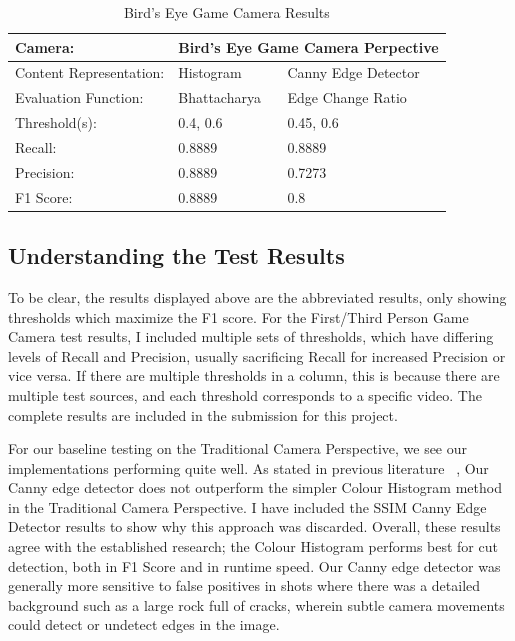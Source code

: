 \documentclass[12pt]{article}
\begin{document}
\begin{table}[h!]
    \begin{tabular}{|l|l|l|}
    \hline
    Camera:                 & \multicolumn{2}{l|}{Bird's Eye Game Camera Perpective} \\ \hline
    Content Representation: & Histogram            & Canny Edge Detector        \\ \hline
    Evaluation Function:    & Bhattacharya         & Edge Change Ratio          \\ \hline
    Threshold(s):           & 0.4, 0.6             & 0.45, 0.6                  \\ \hline
    Recall:                 & 0.8889               & 0.8889                     \\ \hline
    Precision:              & 0.8889               & 0.7273                     \\ \hline
    F1 Score:               & 0.8889               & 0.8                        \\ \hline
    \end{tabular}
    \caption{Bird's Eye Game Camera Results}
    \label{Bird's Eye Game Camera Results}
\end{table}
\subsection{Understanding the Test Results}
To be clear, the results displayed above are the abbreviated results, only showing thresholds which maximize the F1 score. For the First/Third Person Game Camera test results,
I included multiple sets of thresholds, which have differing levels of Recall and Precision, usually sacrificing Recall for increased Precision or vice versa. If there are 
multiple thresholds in a column, this is because there are multiple test sources, and each threshold corresponds to a specific video. The complete results are included in 
the submission for this project.

For our baseline testing on the Traditional Camera Perspective, we see our implementations performing quite well. As stated in previous literature ~\cite{lienhart1998comparison},
Our Canny edge detector does not outperform the simpler Colour Histogram method in the Traditional Camera Perspective. I have included the SSIM Canny Edge Detector results 
to show why this approach was discarded. Overall, these results agree with the established research; the Colour Histogram performs best for cut detection, both in F1 Score 
and in runtime speed. Our Canny edge detector was generally more sensitive to false positives in shots where there was a detailed background such as a large rock full of cracks, 
wherein subtle camera movements could detect or undetect edges in the image.
\end{document}
